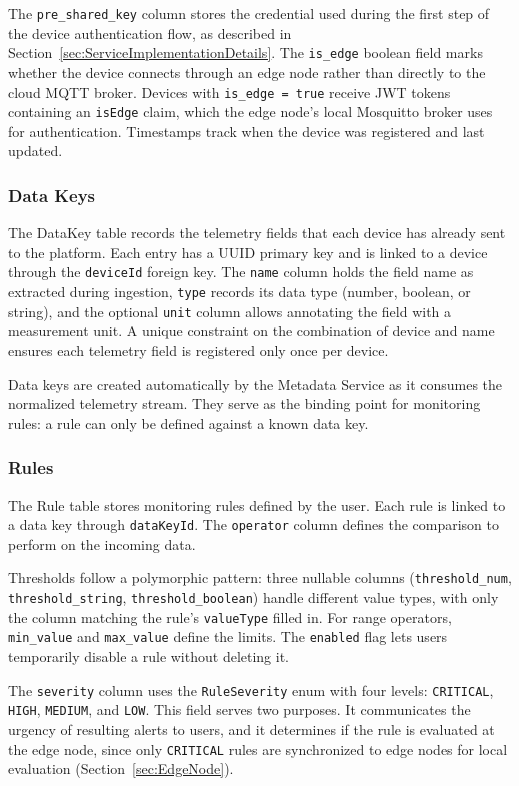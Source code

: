 The \texttt{pre\_shared\_key} column stores the credential used during the first step of the device authentication flow, as described in Section~\ref{sec:ServiceImplementationDetails}. The \texttt{is\_edge} boolean field marks whether the device connects through an edge node rather than directly to the cloud \gls{MQTT} broker. Devices with \texttt{is\_edge = true} receive \gls{JWT} tokens containing an \texttt{isEdge} claim, which the edge node's local Mosquitto broker uses for authentication. Timestamps track when the device was registered and last updated.

\subsubsection{Data Keys}
The DataKey table records the telemetry fields that each device has already sent to the platform. Each entry has a \gls{UUID} primary key and is linked to a device through the \texttt{deviceId} foreign key. The \texttt{name} column holds the field name as extracted during ingestion, \texttt{type} records its data type (number, boolean, or string), and the optional \texttt{unit} column allows annotating the field with a measurement unit. A unique constraint on the combination of device and name ensures each telemetry field is registered only once per device.

Data keys are created automatically by the Metadata Service as it consumes the normalized telemetry stream. They serve as the binding point for monitoring rules: a rule can only be defined against a known data key.

\subsubsection{Rules}
The Rule table stores monitoring rules defined by the user. Each rule is linked to a data key through \texttt{dataKeyId}. The \texttt{operator} column defines the comparison to perform on the incoming data.

Thresholds follow a polymorphic pattern: three nullable columns (\texttt{threshold\_num}, \texttt{threshold\_string}, \texttt{threshold\_boolean}) handle different value types, with only the column matching the rule's \texttt{valueType} filled in. For range operators, \texttt{min\_value} and \texttt{max\_value} define the limits. The \texttt{enabled} flag lets users temporarily disable a rule without deleting it.

The \texttt{severity} column uses the \texttt{RuleSeverity} enum with four levels: \texttt{CRITICAL}, \texttt{HIGH}, \texttt{MEDIUM}, and \texttt{LOW}. This field serves two purposes. It communicates the urgency of resulting alerts to users, and it determines if the rule is evaluated at the edge node, since only \texttt{CRITICAL} rules are synchronized to edge nodes for local evaluation (Section~\ref{sec:EdgeNode}).

